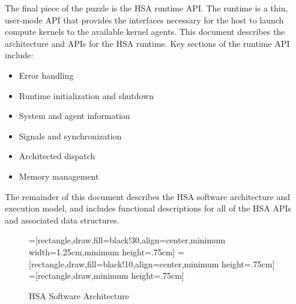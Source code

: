 \documentclass[final,oneside]{book}
\begin{document}
The final piece of the puzzle is the HSA runtime API.  The runtime is a thin,
user-mode API that provides the interfaces necessary for the host to launch
compute kernels to the available kernel agents. This document describes the
architecture and APIs for the HSA runtime. Key sections of the runtime API
include:
\begin{itemize}[itemsep=0pt,topsep=0pt,partopsep=0pt]
\item Error handling
\item Runtime initialization and shutdown
\item System and agent information
\item Signals and synchronization
\item Architected dispatch
\item Memory management
\end{itemize}

The remainder of this document describes the HSA software architecture and
execution model, and includes functional descriptions for all of the HSA APIs
and associated data structures.

\begin{figure}[t]
  \centering
  =[rectangle,draw,fill=black!30,align=center,minimum width=1.25cm,minimum height=.75cm]
  =[rectangle,draw,fill=black!10,align=center,minimum height=.75cm]
  =[rectangle,draw,minimum height=.75cm]
  \caption{HSA Software Architecture}
  \label{fig:swarch}
\end{figure}
\end{document}
